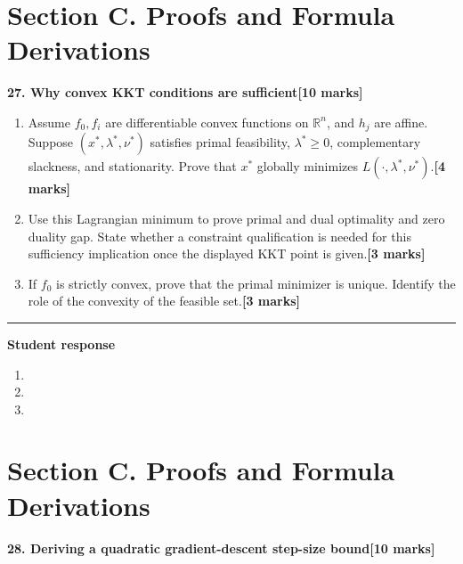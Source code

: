 \documentclass[11pt,a4paper]{article}
\newlength{\BlankAnswerHeight}\setlength{\BlankAnswerHeight}{16mm}
\newcommand{\AnswerBlank}{\leavevmode\par\vspace{\BlankAnswerHeight}}
\begin{document}
\newpage\section*{Section C. Proofs and Formula Derivations}
\textbf{27. Why convex KKT conditions are sufficient}\hfill\textbf{[10 marks]}\par\medskip
\begin{enumerate}[label=(\alph*),leftmargin=8mm,itemsep=3pt]
\item Assume \(f_0,f_i\) are differentiable convex functions on \(\mathbb R^n\), and \(h_j\) are affine. Suppose \((x^*,\lambda^*,\nu^*)\) satisfies primal feasibility, \(\lambda^*\ge0\), complementary slackness, and stationarity. Prove that \(x^*\) globally minimizes \(L(\cdot,\lambda^*,\nu^*)\).\hfill\textbf{[4 marks]}
\item Use this Lagrangian minimum to prove primal and dual optimality and zero duality gap. State whether a constraint qualification is needed for this sufficiency implication once the displayed KKT point is given.\hfill\textbf{[3 marks]}
\item If \(f_0\) is strictly convex, prove that the primal minimizer is unique. Identify the role of the convexity of the feasible set.\hfill\textbf{[3 marks]}
\end{enumerate}\par\medskip\hrule\medskip\textbf{Student response}\par
\begin{enumerate}[label=(\alph*),leftmargin=8mm,itemsep=3pt]
\item
\AnswerBlank
\item
\AnswerBlank
\item
\AnswerBlank
\end{enumerate}
\newpage\section*{Section C. Proofs and Formula Derivations}
\textbf{28. Deriving a quadratic gradient-descent step-size bound}\hfill\textbf{[10 marks]}\par\medskip
\end{document}
